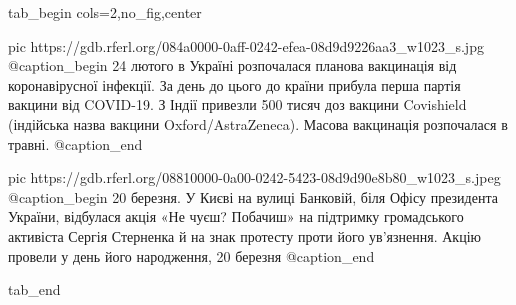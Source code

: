  
 
 
 
 


\ifcmt
  tab_begin cols=2,no_fig,center

     pic https://gdb.rferl.org/084a0000-0aff-0242-efea-08d9d9226aa3_w1023_s.jpg
		 @caption_begin
24 лютого в Україні розпочалася планова вакцинація від коронавірусної інфекції.
За день до цього до країни прибула перша партія вакцини від COVID-19. З Індії
привезли 500 тисяч доз вакцини Covishield (індійська назва вакцини
Oxford/AstraZeneca). Масова вакцинація розпочалася в травні.
		 @caption_end

		 pic https://gdb.rferl.org/08810000-0a00-0242-5423-08d9d90e8b80_w1023_s.jpeg
		 @caption_begin
20 березня. У Києві на вулиці Банковій, біля Офісу президента України,
відбулася акція «Не чуєш? Побачиш» на підтримку громадського активіста Сергія
Стерненка й на знак протесту проти його ув’язнення. Акцію провели у день його
народження, 20 березня 
		 @caption_end

  tab_end
\fi
